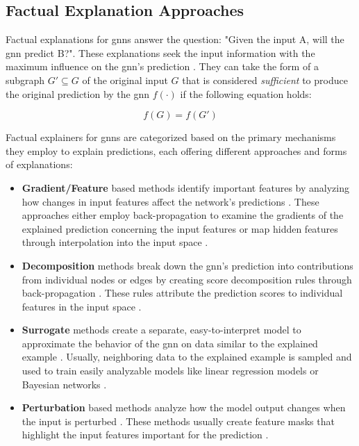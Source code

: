 \subsection{Factual Explanation Approaches}
\label{s_ExplainingGNNs_Factual}

Factual explanations for \glspl{gnn} answer the question: "Given the input A, will the \gls{gnn} predict B?". These explanations seek the input information with the maximum influence on the \gls{gnn}'s prediction \cite{kakkad_survey_2023}. They can take the form of a subgraph $G' \subseteq G$ of the original input $G$ \cite{kakkad_survey_2023} that is considered \textit{sufficient} to produce the original prediction by the \gls{gnn} $f(\cdot)$ \cite{tan_learning_2022} if the following equation holds:

\begin{equation}
    f(G) = f(G')
\end{equation}

Factual explainers for \glspl{gnn} are categorized based on the primary mechanisms they employ to explain predictions, each offering different approaches and forms of explanations:

\begin{itemize}
    \item \textbf{Gradient/Feature} based methods identify important features by analyzing how changes in input features affect the network's predictions \cite{yuan_explainability_2020}. These approaches either employ back-propagation to examine the gradients of the explained prediction concerning the input features or map hidden features through interpolation into the input space \cite{yuan_explainability_2020}.
    \item \textbf{Decomposition} methods break down the \gls{gnn}'s prediction into contributions from individual nodes or edges by creating score decomposition rules through back-propagation \cite{yuan_xgnn_2020}. These rules attribute the prediction scores to individual features in the input space \cite{yuan_explainability_2020}.
    \item \textbf{Surrogate} methods create a separate, easy-to-interpret model to approximate the behavior of the \gls{gnn} on data similar to the explained example \cite{yuan_explainability_2020}. Usually, neighboring data to the explained example is sampled and used to train easily analyzable models \cite{yuan_explainability_2020} like linear regression models \cite{duval_graphsvx_2021} or Bayesian networks \cite{vu_pgm-explainer_2020}.
    \item \textbf{Perturbation} based methods analyze how the model output changes when the input is perturbed \cite{yuan_explainability_2020}. These methods usually create feature masks that highlight the input features important for the prediction \cite{yuan_explainability_2020, ivanovs_perturbation-based_2021}.
\end{itemize}

